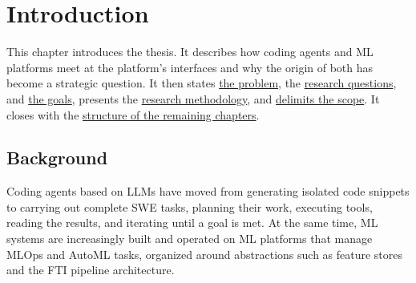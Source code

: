 \documentclass[
english,                 %
bibtex,                  %
]{kththesis}
\numberwithin{listing}{chapter}
\begin{document}
\cleardoublepage
\listoffigures

\cleardoublepage

\listoftables
\cleardoublepage
\printglossary[style=long, type=\acronymtype, title={List of Acronyms and Abbreviations}]


\ifnomenclature
    \cleardoublepage
    \printnomenclature
\fi

\label{pg:lastPageofPreface}
\mainmatter
\glsresetall
\renewcommand{\chaptermark}[1]{\markboth{#1}{}}
\chapter{Introduction}
\label{ch:introduction}

This chapter introduces the thesis. It describes how coding agents and \gls{ML} platforms meet at the platform's interfaces and why the origin of both has become a strategic question. It then states \hyperref[sec:intro_problem]{the problem}, the \hyperref[sec:intro_research_questions]{research questions}, and \hyperref[sec:intro_goals]{the goals}, presents the \hyperref[sec:intro_research_methodology]{research methodology}, and \hyperref[sec:intro_delimitations]{delimits the scope}. It closes with the \hyperref[sec:intro_structure_of_the_thesis]{structure of the remaining chapters}.

\section{Background}
\label{sec:intro_background}
\glsresetall

Coding agents based on \glspl{LLM} have moved from generating isolated code snippets to carrying out complete \gls{SWE} tasks, planning their work, executing tools, reading the results, and iterating until a goal is met. At the same time, \gls{ML} systems are increasingly built and operated on \gls{ML} platforms that manage \gls{MLOps} and \gls{AutoML} tasks, organized around abstractions such as feature stores and the \gls{FTI} pipeline architecture.
\end{document}
